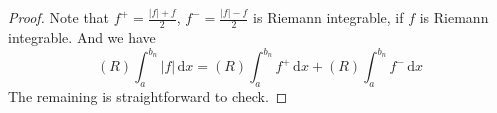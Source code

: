 \documentclass[../main.tex]{subfiles}
\begin{document}
\begin{proof}
       Note that \(  f^{+ }=\frac{\left| f \right|+ f  }{2 }  \), \(  f^{-}= \frac{\left| f \right|-f  }{2 }   \) is Riemann integrable, if \(  f  \) is Riemann integrable.   
       And we have \[
    \left( R \right) \int_{a}^{b_{n}}\left| f \right|\,\mathrm{d} x= \left( R \right) \int_{a}^{b_{n}}f^{+ }\,\mathrm{d} x+\left( R \right)  \int_{a}^{b_{n}}f^{-}\,\mathrm{d} x 
       \] The remaining is straightforward to check.
\end{proof}
\end{document}
